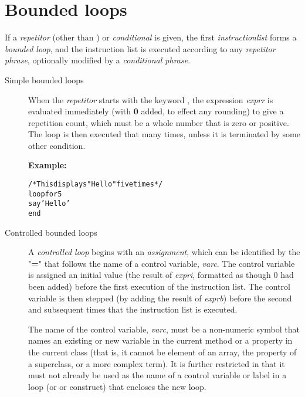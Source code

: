 \section{Bounded loops}
 If a \emph{repetitor} (other than ) or
\emph{conditional} is given, the first \emph{instructionlist}
forms a \emph{bounded loop}, and the instruction list is executed
according to any \emph{repetitor phrase}, optionally modified by a
\emph{conditional phrase}.
\begin{description}
\item[Simple bounded loops]

When the \emph{repetitor} starts with the keyword ,
the expression \emph{exprr} is evaluated immediately
(with \textbf{0} added, to effect any rounding) to give a repetition
count, which must be a whole number that is zero or positive.
The loop is then executed that many times, unless it is terminated by
some other condition.

\textbf{Example:}
\begin{alltt}
/* This displays "Hello" five times */
loop for 5
  say 'Hello'
  end
\end{alltt}
\item[Controlled bounded loops]

A \emph{controlled loop} begins with an \emph{assignment},
which can be identified by the "\textbf{=}" that follows the name
of a control variable, \emph{varc}.
The control variable is assigned an initial value (the result of
\emph{expri}, formatted as though 0 had been added)
before the first execution of the instruction list.
The control variable is then stepped (by adding the result of
\emph{exprb}) before the second and subsequent times that the
instruction list is executed.
 
The name of the control variable, \emph{varc}, must be a non-numeric
symbol that names an existing or new variable in the current method or a
property in the current class (that is, it cannot be element of an
array, the property of a superclass, or a more complex term).  It is
further restricted in that it must not already be used as the name of a
control variable or label in a loop (or  or 
construct) that encloses the new loop.
 

\end{description}
